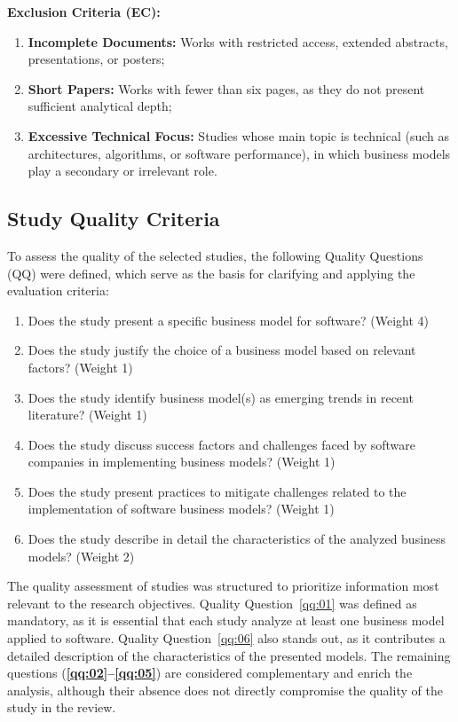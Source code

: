 \documentclass[journal]{IEEEtran}
\begin{document}
\textbf{Exclusion Criteria (EC):}
    \begin{enumerate}[label=\textbf{EC\arabic*.}]
        \item \textbf{Incomplete Documents:} Works with restricted access, extended abstracts, presentations, or posters;

        \item \textbf{Short Papers:} Works with fewer than six pages, as they do not present sufficient analytical depth;

        \item \textbf{Excessive Technical Focus:} Studies whose main topic is technical (such as architectures, algorithms, or software performance), in which business models play a secondary or irrelevant role.
    \end{enumerate}

\subsection{Study Quality Criteria}\label{sec:study-quality-criteria}
To assess the quality of the selected studies, the following Quality Questions (QQ) were defined, which serve as the basis for clarifying and applying the evaluation criteria:

\begin{enumerate}[label=\textbf{QQ\arabic*.}]
    \item Does the study present a specific business model for software? (Weight 4\label{qq:01})
    \item Does the study justify the choice of a business model based on relevant factors? (Weight 1\label{qq:02})
    \item Does the study identify business model(s) as emerging trends in recent literature? (Weight 1\label{qq:03})
    \item Does the study discuss success factors and challenges faced by software companies in implementing business models? (Weight 1\label{qq:04})
    \item Does the study present practices to mitigate challenges related to the implementation of software business models? (Weight 1\label{qq:05})
    \item Does the study describe in detail the characteristics of the analyzed business models? (Weight 2\label{qq:06})
\end{enumerate}

The quality assessment of studies was structured to prioritize information most relevant to the research objectives. Quality Question~\ref{qq:01} was defined as mandatory, as it is essential that each study analyze at least one business model applied to software. Quality Question~\ref{qq:06} also stands out, as it contributes a detailed description of the characteristics of the presented models. The remaining questions (\textbf{\ref{qq:02}--\ref{qq:05}}) are considered complementary and enrich the analysis, although their absence does not directly compromise the quality of the study in the review.
\end{document}
